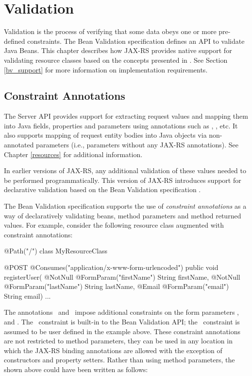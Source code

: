 \chapter{Validation}
\label{validation}

Validation is the process of verifying that some data obeys one or more pre-defined constraints. The Bean Validation specification \cite{bv11} defines an API to validate Java Beans. This chapter describes how JAX-RS provides native support for validating resource classes based on the concepts presented in \cite{bv11}. See Section \ref{bv_support} for more information on implementation requirements.

\section{Constraint Annotations}
\label{constraint_annotations}

The Server API provides support for extracting request values and mapping them into Java fields, properties and parameters using annotations such as , , etc. It also supports mapping of request entity bodies into Java objects via non-annotated parameters (i.e., parameters without any JAX-RS annotations). See Chapter \ref{resources} for additional information.

In earlier versions of JAX-RS, any additional validation of these values needed to be performed programmatically. This version of JAX-RS introduces support for declarative validation based on the Bean Validation specification \cite{bv11}. 

The Bean Validation specification \cite{bv11} supports the use of \emph{constraint annotations} as a way of declaratively validating beans, method parameters and method returned values. For example, consider the following resource class augmented with constraint annotations:

\begin{listing}{1}
@Path("/")
class MyResourceClass {

  @POST
  @Consumes("application/x-www-form-urlencoded")
  public void registerUser(
    @NotNull @FormParam("firstName") String firstName,
    @NotNull @FormParam("lastName") String lastName,
    @Email @FormParam("email") String email) {
    ...
  }
}
\end{listing}

The annotations \NotNull\ and \Email\ impose additional constraints on the form parameters ,  and . The \NotNull\ constraint is built-in to the Bean Validation API; the \Email\ constraint is assumed to be user defined in the example above. These constraint annotations are not restricted to method parameters, they can be used in any location in which the JAX-RS binding annotations are allowed with the exception of constructors and property setters. Rather than using method parameters, the  shown above could have been written as follows:

